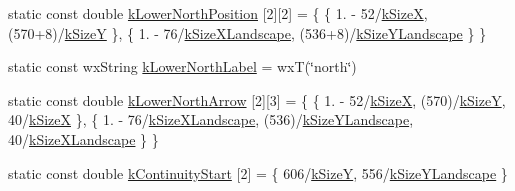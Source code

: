 \begin{DoxyCompactItemize}
\item 
static const double \hyperlink{a00222_a813fd9e949135304a25f6023a1b09304}{k\-Lower\-North\-Position} \mbox{[}2\mbox{]}\mbox{[}2\mbox{]} = \{ \{ 1. -\/ 52/\hyperlink{a00222_af38ec7276eab5e69e2b8b9b74c7e410d}{k\-Size\-X}, (570+8)/\hyperlink{a00222_a96b810fae104880234d8c31ca2b86416}{k\-Size\-Y} \}, \{ 1. -\/ 76/\hyperlink{a00222_a6a5b0e2bab47c3fb6da928006951ed06}{k\-Size\-X\-Landscape}, (536+8)/\hyperlink{a00222_a2874803a217d546e2cc3fe8647bc8506}{k\-Size\-Y\-Landscape} \} \}
\item 
static const wx\-String \hyperlink{a00222_a5472454bc01d15a84603c4506a2157a3}{k\-Lower\-North\-Label} = wx\-T(\char`\"{}north\char`\"{})
\item 
static const double \hyperlink{a00222_a1b7ff2c2a84b6576e5d246538066d545}{k\-Lower\-North\-Arrow} \mbox{[}2\mbox{]}\mbox{[}3\mbox{]} = \{ \{ 1. -\/ 52/\hyperlink{a00222_af38ec7276eab5e69e2b8b9b74c7e410d}{k\-Size\-X}, (570)/\hyperlink{a00222_a96b810fae104880234d8c31ca2b86416}{k\-Size\-Y}, 40/\hyperlink{a00222_af38ec7276eab5e69e2b8b9b74c7e410d}{k\-Size\-X} \}, \{ 1. -\/ 76/\hyperlink{a00222_a6a5b0e2bab47c3fb6da928006951ed06}{k\-Size\-X\-Landscape}, (536)/\hyperlink{a00222_a2874803a217d546e2cc3fe8647bc8506}{k\-Size\-Y\-Landscape}, 40/\hyperlink{a00222_a6a5b0e2bab47c3fb6da928006951ed06}{k\-Size\-X\-Landscape} \} \}
\item 
static const double \hyperlink{a00222_a22335fbdd42d9304c5d7691424e4d22b}{k\-Continuity\-Start} \mbox{[}2\mbox{]} = \{ 606/\hyperlink{a00222_a96b810fae104880234d8c31ca2b86416}{k\-Size\-Y}, 556/\hyperlink{a00222_a2874803a217d546e2cc3fe8647bc8506}{k\-Size\-Y\-Landscape} \}
\end{DoxyCompactItemize}


